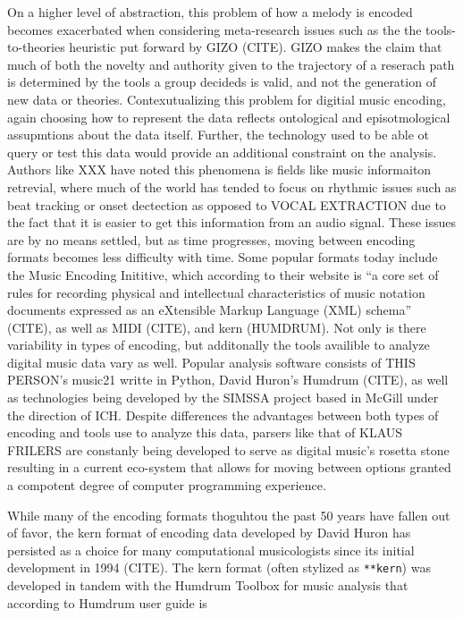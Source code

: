\documentclass[]{book}
\begin{document}
On a higher level of abstraction, this problem of how a melody is encoded becomes exacerbated when considering meta-research issues such as the the tools-to-theories heuristic put forward by GIZO (CITE).
GIZO makes the claim that much of both the novelty and authority given to the trajectory of a reserach path is determined by the tools a group decideds is valid, and not the generation of new data or theories.
Contexutualizing this problem for digitial music encoding, again choosing how to represent the data reflects ontological and episotmological assupmtions about the data itself.
Further, the technology used to be able ot query or test this data would provide an additional constraint on the analysis.
Authors like XXX have noted this phenomena is fields like music informaiton retrevial, where much of the world has tended to focus on rhythmic issues such as beat tracking or onset dectection as opposed to VOCAL EXTRACTION due to the fact that it is easier to get this information from an audio signal.
These issues are by no means settled, but as time progresses, moving between encoding formats becomes less difficulty with time.
Some popular formats today include the Music Encoding Inititive, which according to their website is ``a core set of rules for recording physical and intellectual characteristics of music notation documents expressed as an eXtensible Markup Language (XML) schema'' (CITE), as well as MIDI (CITE), and kern (HUMDRUM).
Not only is there variability in types of encoding, but additonally the tools availible to analyze digital music data vary as well.
Popular analysis software consists of THIS PERSON's music21 writte in Python, David Huron's Humdrum (CITE), as well as technologies being developed by the SIMSSA project based in McGill under the direction of ICH.
Despite differences the advantages between both types of encoding and tools use to analyze this data, parsers like that of KLAUS FRILERS are constanly being developed to serve as digital music's rosetta stone resulting in a current eco-system that allows for moving between options granted a compotent degree of computer programming experience.

While many of the encoding formats thoguhtou the past 50 years have fallen out of favor, the kern format of encoding data developed by David Huron has persisted as a choice for many computational musicologists since its initial development in 1994 (CITE).
The kern format (often stylized as \texttt{**kern}) was developed in tandem with the Humdrum Toolbox for music analysis that according to Humdrum user guide is
\end{document}
